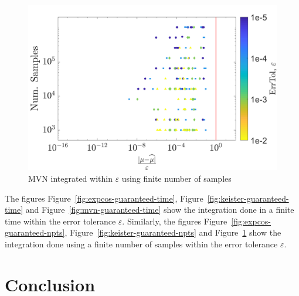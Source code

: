 \documentclass[twocolumn]{svjour3}          %
\newcommand\figref{Figure~\ref}
\begin{document}
\begin{figure}
	\centering
	\includegraphics[width=0.95\linewidth]{"figures/MVN guaranteed npts 19-Jul-2018 00-01-41"}
	\caption[MVN guaranteed : Number of sample]{MVN integrated within $\varepsilon$ using finite number of samples}
	\label{fig:mvn-guaranteed-npts}
\end{figure}


The figures \figref{fig:expcos-guaranteed-time}, \figref{fig:keister-guaranteed-time} and \figref{fig:mvn-guaranteed-time} show the integration done in a finite time within the error tolerance $\varepsilon$. 
Similarly, the figures \figref{fig:expcos-guaranteed-npts}, \figref{fig:keister-guaranteed-npts} and \figref{fig:mvn-guaranteed-npts} show the integration done using a finite number of samples within the error tolerance $\varepsilon$.


\section{Conclusion}
\end{document}

